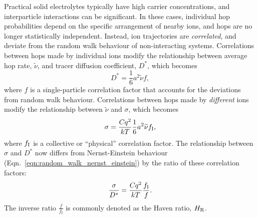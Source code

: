 \documentclass[aps,prb,twocolumn,superscriptaddress,reprint]{revtex4-1}
\newcommand{\hrpa}{{\widetilde{\nu}}}
\begin{document}
Practical solid electrolytes typically have high carrier concentrations, and interparticle interactions can be significant. 
In these cases, individual hop probabilities depend on the specific arrangement of nearby ions, and hops are no longer statistically independent. 
Instead, ion trajectories are \emph{correlated}, and deviate from the random walk behaviour of non-interacting systems.\cite{BardeenAndHerring_Imperfections1952, CompaanAndHaven_TransFaradaySoc1958, AllnattAndLidiard_AtomicTransportInSolids,HowardAndLidiard_RepProgPhys1964} Correlations between hops made by individual ions modify the relationship between average hop rate, $\hrpa$, and tracer diffusion coefficient, $D^*$, which becomes
\begin{equation}
  D^* = \frac{1}{6}a^2\hrpa f,
  \label{eqn:correlated_diffusion}
\end{equation}
where $f$ is a single-particle correlation factor that accounts for the deviations from random walk behaviour. 
Correlations between hops made by \emph{different} ions modify the relationship between $\hrpa$ and $\sigma$, which becomes
\begin{equation}
  \sigma = \frac{Cq^2}{kT}\frac{1}{6}a^2\hrpa f_\m{I},
  \label{eqn:correlated_conductivity}
\end{equation}
where $f_{\mathrm{I}}$ is a collective or ``physical'' correlation factor.\cite{Mehrer_DiffusionBook, Murch_SolStatIonics1982,SatoAndKikuchi_JChemPhys1971} 
The relationship between $\sigma$ and $D^*$ now differs from Nernst-Einstein behaviour (Eqn.~\ref{eqn:random_walk_nernst_einstein}) by the ratio of these correlation factors:
\begin{equation}
  \frac{\sigma}{D^*} = \frac{Cq^2}{kT}\frac{f_{\mathrm{I}}}{f}.
  \label{eqn:correlated_nernst_einstein}
\end{equation}
The inverse ratio $\frac{f}{f_\mathrm{I}}$ is commonly denoted as the Haven ratio, $H_{\mathrm{R}}$\cite{Murch_SolStatIonics1982,Akbar_JApplPhys1994}.
\end{document}

